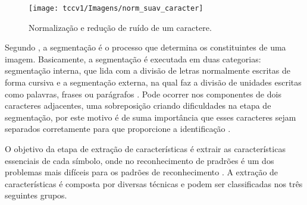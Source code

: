  \begin{figure}[h]
	\centering
	\texttt{[image: tccv1/Imagens/norm\_suav\_caracter]} 
	\caption[Normalização e redução de ruído de um caractere.]{Normalização e redução de ruído de um caractere.}
	\label{fig:tux_laplace}
\end{figure}

Segundo , a segmentação é o processo que determina os constituintes de uma imagem. Basicamente, a segmentação é executada em duas categorias: segmentação interna, que lida com a divisão de letras normalmente escritas de forma cursiva e a segmentação externa, na qual faz a divisão de unidades escritas como palavras, frases ou parágrafos \cite{Goswami2013}. Pode ocorrer nos componentes de dois caracteres adjacentes, uma sobreposição criando dificuldades na etapa de segmentação, por este motivo é de suma importância que esses caracteres sejam separados corretamente para que proporcione a identificação \cite{Bhatia2014}.

O objetivo da etapa de extração de características é extrair as características
essenciais de cada símbolo, onde no reconhecimento de pradrões é um dos problemas mais difíceis para os padrões de reconhecimento \cite{Eikvil1993}. A extração de características é composta por diversas técnicas e podem ser classificadas nos três seguintes grupos.

